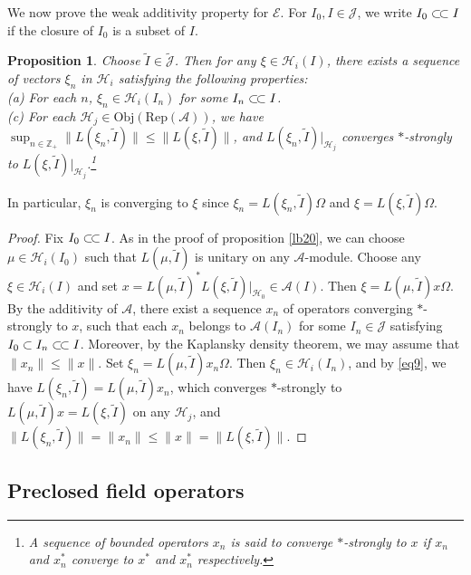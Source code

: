 \documentclass[12pt,a4paper]{article}
\theoremstyle{definition}
\theoremstyle{plain}
\newtheorem{pp}[df]{Proposition}
\newcommand{\mc}{\mathcal}
\newcommand{\wtd}{\widetilde}
\newcommand{\scr}{\mathscr}
\newcommand{\sjs}{\subset\joinrel\subset}
\newcommand{\Jtd}{\widetilde{\mathcal J}}
\newcommand{\RepA}{\mathrm{Rep}(\mc A)}
\newcommand{\mbb}{\mathbb}
\newcommand{\Obj}{\mathrm{Obj}}
\numberwithin{equation}{subsection}
\begin{document}
We now prove the weak additivity property for $\scr E$. For $I_0,I\in\mc J$, we write $I_0\sjs I$ if the closure of $I_0$ is a subset of $I$.

\begin{pp}\label{lb7}
Choose $\wtd I\in\Jtd$. Then for any $\xi\in\mc H_i(I)$, there exists a sequence of vectors $\xi_n$ in $\mc H_i$ satisfying the following properties:\\
	(a) For each $n$, $\xi_n\in\mc H_i(I_n)$ for some $I_n\subset\joinrel\subset I$.\\
	(c) For each $\mc H_j\in\Obj(\RepA)$, we have $\sup_{n\in\mbb Z_+}\big\lVert L(\xi_n,\wtd I) \big\lVert\leq\big\lVert L(\xi,\wtd I) \big\lVert$, and $L(\xi_n,\wtd I)|_{\mc H_j}$ converges $*$-strongly to $L(\xi,\wtd I)|_{\mc H_j}$.\footnote{A sequence of bounded operators $x_n$ is said to converge $*$-strongly to $x$ if $x_n$ and $x_n^*$ converge to $x^*$ and $x_n^*$ respectively.}
\end{pp}
In particular, $\xi_n$ is converging to $\xi$ since $\xi_n=L(\xi_n,\wtd I)\Omega$ and $\xi=L(\xi,\wtd I)\Omega$.

\begin{proof}
Fix $I_0\sjs I$. As in the proof of proposition \ref{lb20}, we can choose $\mu\in\mc H_i(I_0)$ such that $L(\mu,\wtd I)$ is unitary on any $\mc A$-module. Choose any $\xi\in\mc H_i(I)$ and set $x=L(\mu,\wtd I)^*L(\xi,\wtd I)|_{\mc H_0}\in\mc A(I)$. Then $\xi=L(\mu,\wtd I)x\Omega$.  By the additivity of $\mc A$, there exist a sequence  $x_n$ of operators converging $*$-strongly to $x$, such that each $x_n$ belongs to $\mc A(I_n)$ for some $I_n\in\mc J$ satisfying $I_0\subset I_n\sjs I$. Moreover, by the Kaplansky density theorem, we may assume that $\lVert x_n\lVert\leq\lVert x\lVert$. Set $\xi_n=L(\mu,\wtd I)x_n\Omega$. Then $\xi_n\in\mc H_i(I_n)$, and by \eqref{eq9}, we have $L(\xi_n,\wtd I)=L(\mu,\wtd I)x_n$, which converges $*$-strongly to $L(\mu,\wtd I)x=L(\xi,\wtd I)$ on any $\mc H_j$, and $\big\lVert L(\xi_n,\wtd I)\big\lVert= \lVert x_n\lVert\leq \lVert x\lVert=\big\lVert L(\xi,\wtd I)\big\lVert$.
\end{proof}





\subsection{Preclosed field operators}\label{lb11}
\end{document}
